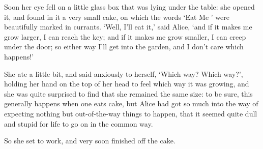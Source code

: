 \documentclass[
    11pt,
    a4paper
]{article}
\begin{document}
Soon her eye fell on a little glass box that was lying under the table:
she opened it, and found in it a very small cake, on which the words
`{Eat Me} ' were beautifully marked in currants. `Well, I'll eat it,' said
Alice, `and if it makes me grow larger, I can reach the key; and if it
makes me grow smaller, I can creep under the door; so either way I'll
get into the garden, and I don't care which happens!'

She ate a little bit, and said anxiously to herself, `Which way? Which
way?', holding her hand on the top of her head to feel which way it was
growing, and she was quite surprised to find that she remained the same
size: to be sure, this generally happens when one eats cake, but Alice
had got so much into the way of expecting nothing but out-of-the-way
things to happen, that it seemed quite dull and stupid for life to go on
in the common way.

So she set to work, and very soon finished off the cake.
\end{document}

